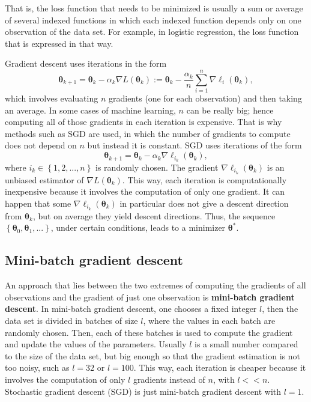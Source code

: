 That is, the loss function that needs to be minimized is usually a sum or average of several indexed functions in which each indexed function depends only on one observation of the data set. For example, in logistic regression, the loss function that is expressed in that way.

Gradient descent uses iterations in the form
\begin{equation}
  \boldsymbol{\theta}_{k+1} = \boldsymbol{\theta}_k - \alpha_k \nabla L(\boldsymbol{\theta}_k) :=\boldsymbol{\theta}_k - \frac{\alpha_k}{n} \sum_{i = 1}^n \nabla \ell_i(\boldsymbol{\theta}_k),
\end{equation}
which involves evaluating $n$ gradients (one for each observation) and then taking an average. In some cases of machine learning, $n$ can be really big; hence computing all of those gradients in each iteration is expensive. That is why methods such as SGD are used, in which the number of gradients to compute does not depend on $n$ but instead it is constant. SGD uses iterations of the form
\begin{equation}
  \boldsymbol{\theta}_{k+1} = \boldsymbol{\theta}_k - \alpha_k \nabla \ell_{i_k}(\boldsymbol{\theta}_k),
\end{equation}
where $i_k \in \left\{1, 2, ..., n \right\}$ is randomly chosen. The gradient $\nabla \ell_{i_k}(\boldsymbol{\theta}_k)$ is an unbiased estimator of $\nabla L(\boldsymbol{\theta}_k)$. This way, each iteration is computationally inexpensive because it involves the computation of only one gradient.
It can happen that some $\nabla \ell_{i_k}(\boldsymbol{\theta}_k)$ in particular does not give a descent direction from $\boldsymbol{\theta}_k$, but on average they yield descent directions. Thus, the sequence $\left\{ \boldsymbol{\theta}_0, \boldsymbol{\theta}_1, ... \right\}$, under certain conditions, leads to a minimizer $\boldsymbol{\theta}^*$.

\subsection{Mini-batch gradient descent}

An approach that lies between the two extremes of computing the gradients of all observations and the gradient of just one observation is \textbf{mini-batch gradient descent}. In mini-batch gradient descent, one chooses a fixed integer $l$, then the data set is divided in batches of size $l$, where the values in each batch are randomly chosen. Then, each of these batches is used to compute the gradient and update the values of the parameters. Usually $l$ is a small number compared to the size of the data set, but big enough so that the gradient estimation is not too noisy, such as $l = 32$ or $l = 100$. This way, each iteration is cheaper because it involves the computation of only $l$ gradients instead of $n$, with $l << n$. Stochastic gradient descent (SGD) is just mini-batch gradient descent with $l = 1$.

